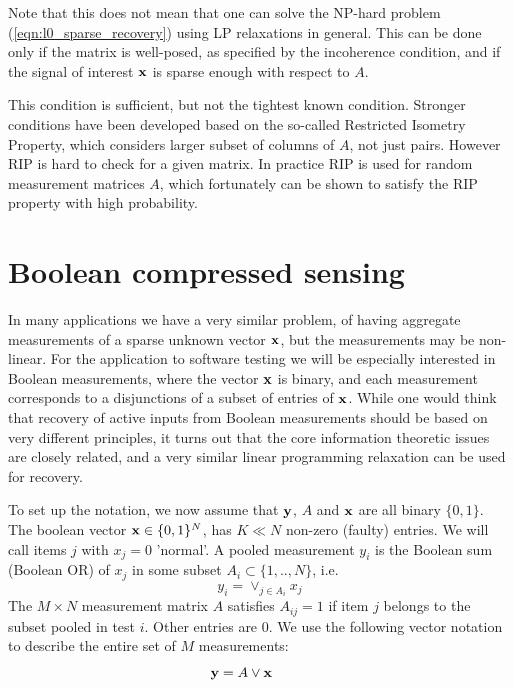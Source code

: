Note that this does not mean that one can solve the NP-hard problem (\ref{eqn:l0_sparse_recovery})
using LP relaxations in general. This can be done only if the matrix is well-posed, as 
specified by the incoherence condition, and if the signal of interest $\mathbf{x}$ is sparse enough
with respect to $A$. 

This condition is sufficient, but not the tightest known condition. 
Stronger conditions have been developed based on the so-called Restricted Isometry Property, 
\cite{Candes_RIP} which considers larger subset of columns of $A$, not just pairs. 
However RIP is hard to check for a given matrix. In practice RIP is used for random measurement
matrices $A$, which fortunately can be shown to satisfy the RIP property with high probability. \\


\section{ Boolean compressed sensing}
\label{s:boolean_compressed_sensing}
In many applications we have a very similar problem, of having aggregate measurements 
of a sparse unknown vector $\mathbf{x}$, but the measurements may be non-linear.  For the application
to software testing we will be especially interested in Boolean measurements, where the 
vector $\mathbf{x}$ is binary, and each measurement corresponds to a disjunctions of a subset 
of entries of $\mathbf{x}$.  While one would think that recovery of active inputs from 
Boolean measurements should be based on very different principles, it turns
out that the core information theoretic issues are closely related, and a very similar linear
programming relaxation can be used for recovery. 

To set up the notation, we now assume that $\mathbf{y}$, $A$ and $\mathbf{x}$ are all binary $\{0, 1\}$.
The boolean vector $\mathbf{x} \in \{0, 1\}^N$, has $K \ll N$ non-zero (faulty) entries. 
We will call items $j$ with $x_j = 0$ 'normal'. A pooled measurement $y_i$ is the 
Boolean sum (Boolean OR) of $x_j$ in some subset $A_i \subset \{1,..,N\}$, i.e. 
\begin{equation}
y_i = \vee_{j \in A_i} x_j
\end{equation}
The $M \times N$ measurement matrix $A$ satisfies $A_{ij} = 1$ if item $j$ belongs 
to the subset pooled in test $i$. Other entries are $0$. We use the following vector 
notation to describe the entire set of $M$ measurements:
\begin{equation*}
\mathbf{y} = A \vee \mathbf{x}~~~~~~~~
\end{equation*}

